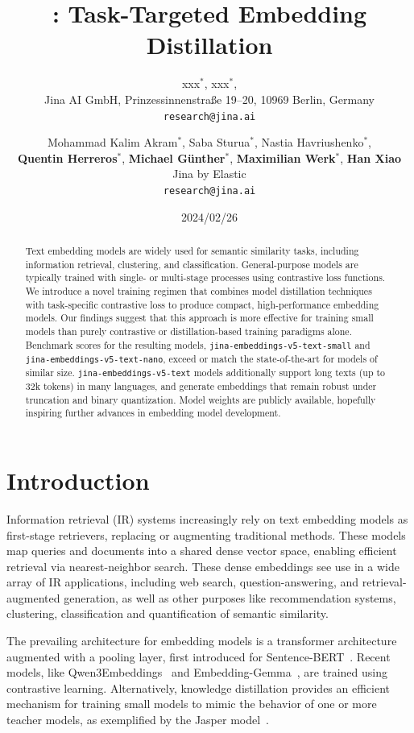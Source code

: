 \documentclass[11pt]{article}
\title{\JEmbeddingVFiveText: Task-Targeted Embedding Distillation}
\author{xxx$^*$, xxx$^*$, \\
Jina AI GmbH, Prinzessinnenstraße 19--20, 10969 Berlin, Germany \\
\texttt{research@jina.ai}
}
\author{Mohammad Kalim Akram$^*$, Saba Sturua$^*$, Nastia Havriushenko$^*$, \\ \textbf{Quentin Herreros$^*$}, \textbf{Michael G\"unther$^*$}, \textbf{Maximilian Werk$^*$},  \textbf{Han Xiao} \\ Jina by Elastic \\ \texttt{research@jina.ai}}
\date{2024/02/26}
\begin{document}
\maketitle

\def\thefootnote{*}\def\thefootnote{\arabic{footnote}}

\begin{abstract}
Text embedding models are widely used for semantic similarity tasks, including information retrieval, clustering, and classification.
General-purpose models are typically trained with single- or multi-stage processes using contrastive loss functions.
We introduce a novel training regimen that combines model distillation techniques with task-specific contrastive loss to produce compact, high-performance embedding models.
Our findings suggest that this approach is more effective for training small models than purely contrastive or distillation-based training paradigms alone.
Benchmark scores for the resulting models, \texttt{jina-\allowbreak{}embeddings-v5-\allowbreak{}text-small} and \texttt{jina-\allowbreak{}embeddings-v5-\allowbreak{}text-nano}, exceed or match the state-of-the-art for models of similar size.
\texttt{jina-\allowbreak{}embeddings-v5-\allowbreak{}text} models additionally support long texts (up to 32k tokens) in many languages, and generate embeddings that remain robust under truncation and binary quantization.
Model weights are publicly available, hopefully inspiring further advances in embedding model development.
\end{abstract}


\section{Introduction}
\label{sec:introduction}
Information retrieval (IR) systems increasingly rely on text embedding models as first-stage retrievers, replacing or augmenting traditional methods.
These models map queries and documents into a shared dense vector space, enabling efficient retrieval via nearest-neighbor search.
These dense embeddings see use in a wide array of IR applications, including web search, question-answering, and retrieval-augmented generation, as well as other purposes like recommendation systems, clustering, classification and quantification of semantic similarity.

The prevailing architecture for embedding models is a transformer architecture augmented with a pooling layer, first introduced for Sentence-BERT~\cite{reimers2019sentence}.
Recent models, like Qwen3Embeddings~\cite{zhang2025qwen3} and Embedding-Gemma~\cite{vera2025embeddinggemma}, are trained using contrastive learning.
Alternatively, knowledge distillation provides an efficient mechanism for training small models to mimic the behavior of one or more teacher models, as exemplified by the Jasper model~\cite{zhang2024jasper}.
\end{document}
